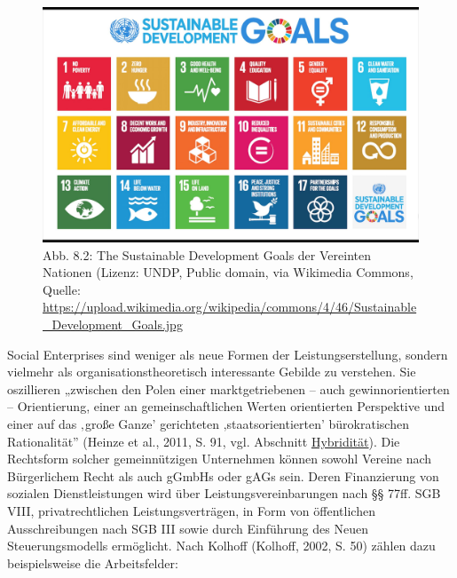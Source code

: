 \documentclass[
  letterpaper,
]{book}
\begin{document}
\begin{figure}

\includegraphics[width=0.75\linewidth,height=\textheight,keepaspectratio]{images/figure82.jpeg} \hfill{}

\caption{Abb. 8.2: The Sustainable Development Goals der Vereinten
Nationen (Lizenz: UNDP, Public domain, via Wikimedia Commons, Quelle:
\url{https://upload.wikimedia.org/wikipedia/commons/4/46/Sustainable_Development_Goals.jpg}}

\end{figure}%

Social Enterprises sind weniger als neue Formen der Leistungserstellung,
sondern vielmehr als organisationstheoretisch interessante Gebilde zu
verstehen. Sie oszillieren „zwischen den Polen einer marktgetriebenen --
auch gewinnorientierten -- Orientierung, einer an gemeinschaftlichen
Werten orientierten Perspektive und einer auf das ‚große Ganze'
gerichteten ‚staatsorientierten' bürokratischen Rationalität'' (Heinze
et al., 2011, S. 91, vgl. Abschnitt
\href{2_schluesselkonzepte.qmd\#hybriditaet}{Hybridität}). Die
Rechtsform solcher gemeinnützigen Unternehmen können sowohl Vereine nach
Bürgerlichem Recht als auch gGmbHs oder gAGs sein. Deren Finanzierung
von sozialen Dienstleistungen wird über Leistungsvereinbarungen nach §§
77ff. SGB VIII, privatrechtlichen Leistungsverträgen, in Form von
öffentlichen Ausschreibungen nach SGB III sowie durch Einführung des
Neuen Steuerungsmodells ermöglicht. Nach Kolhoff (Kolhoff, 2002, S. 50)
zählen dazu beispielsweise die Arbeitsfelder:
\end{document}
